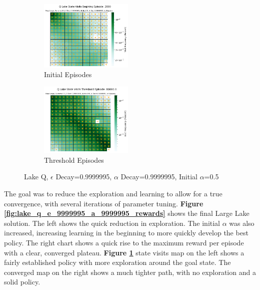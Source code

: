 \documentclass[letterpaper]{article} %
\begin{document}
\begin{figure}[!htb]
	\begin{subfigure}[b]{0.25\textwidth}
		\centering
		\includegraphics[width=1.75in]{Figures/Q_Lake_State_Visits_Begining_Episode__2000_Map_Large__Gamma_0_9__E_Dec_0_9999995__Alpha_0_5__A_Dec_0_9999995__Is_Slippery.png}
		\caption{Initial Episodes}
  	\end{subfigure}%
	\begin{subfigure}[b]{0.25\textwidth}
		\centering
		\includegraphics[width=1.75in]{Figures/Q_Lake_State_Visits_Threshold_Episode__80000_0_Map_Large__Gamma_0_9__E_Dec_0_9999995__Alpha_0_5__A_Dec_0_9999995__Is_Slippery.png}
		\caption{Threshold Episodes}
  	\end{subfigure}%
\caption{Lake Q,  $\epsilon$ Decay=0.9999995, $\alpha$ Decay=0.9999995, Initial $\alpha$=0.5}
\label{fig:lake_q_e_9999995_a_9999995_maps}
\end{figure}

The goal was to reduce the exploration and learning to allow for a true convergence, with several iterations of parameter tuning. \textbf{Figure \ref{fig:lake_q_e_9999995_a_9999995_rewards}} shows the final Large Lake solution.  The left shows the quick reduction in exploration.  The initial $\alpha$ was also increased, increasing learning in the beginning to more quickly develop the best policy.  The right chart shows a quick rise to the maximum reward per episode with a clear, converged plateau.  \textbf{Figure \ref{fig:lake_q_e_9999995_a_9999995_maps}} state visits map on the left shows a fairly established policy with more exploration around the goal state.  The converged map on the right shows a much tighter path, with no exploration and a solid policy.
\end{document}
